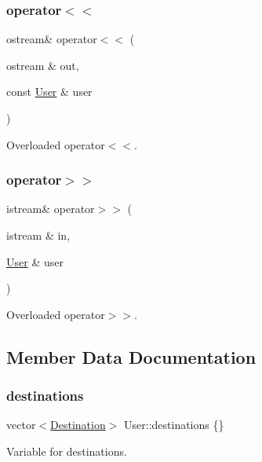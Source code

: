 \subsubsection{\texorpdfstring{operator$<$$<$}{operator<<}}
{\footnotesize\ttfamily ostream\& operator$<$$<$ (\begin{DoxyParamCaption}\item[{ostream \&}]{out,  }\item[{const \hyperlink{class_user}{User} \&}]{user }\end{DoxyParamCaption})\hspace{0.3cm}{\ttfamily [friend]}}

Overloaded operator$<$$<$. \mbox{\label{class_user_aae624f64cdd1af3b59c2443cffa82494}} 
\subsubsection{\texorpdfstring{operator$>$$>$}{operator>>}}
{\footnotesize\ttfamily istream\& operator$>$$>$ (\begin{DoxyParamCaption}\item[{istream \&}]{in,  }\item[{\hyperlink{class_user}{User} \&}]{user }\end{DoxyParamCaption})\hspace{0.3cm}{\ttfamily [friend]}}

Overloaded operator$>$$>$. 

\subsection{Member Data Documentation}
\mbox{\label{class_user_ab150b363696aa72f8bec27714961c37e}} 
\subsubsection{\texorpdfstring{destinations}{destinations}}
{\footnotesize\ttfamily vector$<$\hyperlink{class_destination}{Destination}$>$ User\+::destinations \{\}\hspace{0.3cm}{\ttfamily [private]}}

Variable for destinations. \mbox{\label{class_user_a2d678acd22b533660b4b7d8404961f14}} 
